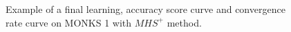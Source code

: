 \begin{appendices}
\begin{figure}[H]
\begin{subfigure}{0.40\textwidth}
                    \label{fig:monks_1_ACC_CGD}
                \end{subfigure}
                \begin{subfigure}{0.40\textwidth}
                    \caption{}
                    \label{fig:monks_1_NORM_CGD}
                \end{subfigure}
                \caption{Example of a final learning, accuracy score curve and
                convergence rate curve on MONKS 1 with $MHS^+$ method.}
                \label{fig:monks_1_CGD}
            \end{figure}


\end{appendices}
